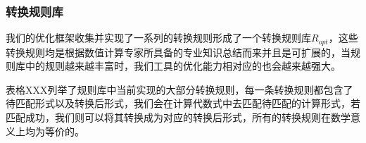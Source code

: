 \subsubsection{转换规则库}

我们的优化框架收集并实现了一系列的转换规则形成了一个转换规则库$R_{opt}$，这些转换规则均是根据数值计算专家所具备的专业知识总结而来并且是可扩展的，当规则库中的规则越来越丰富时，我们工具的优化能力相对应的也会越来越强大。
 
表格XXX列举了规则库中当前实现的大部分转换规则，每一条转换规则都包含了待匹配形式以及转换后形式，我们会在计算代数式中去匹配待匹配的计算形式，若匹配成功，我们则可以将其转换成为对应的转换后形式，所有的转换规则在数学意义上均为等价的。

\newcommand{\tabincell}[2]{
    \begin{tabular}{@{}#1@{}}#2\end{tabular}
} 
